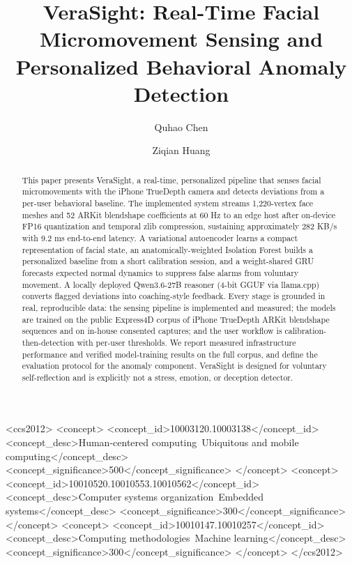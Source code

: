 \documentclass[sigconf]{acmart}
\begin{document}
\title[VeraSight: Real-Time Facial Micromovement Sensing]{VeraSight: Real-Time Facial Micromovement Sensing and Personalized Behavioral Anomaly Detection}

\author{Quhao Chen}

\author{Ziqian Huang}

\renewcommand{\shortauthors}{William Quhao Chen and Ziqian Huang}

\begin{abstract}
This paper presents VeraSight, a real-time, personalized pipeline that senses
facial micromovements with the iPhone TrueDepth camera and detects deviations
from a per-user behavioral baseline. The implemented system streams 1,220-vertex
face meshes and 52 ARKit blendshape coefficients at 60 Hz to an edge host after
on-device FP16 quantization and temporal zlib compression, sustaining
approximately 282 KB/s with 9.2 ms end-to-end latency. A variational
autoencoder learns a compact representation of facial state, an
anatomically-weighted Isolation Forest builds a personalized baseline from a
short calibration session, and a weight-shared GRU forecasts expected normal
dynamics to suppress false alarms from voluntary movement. A locally deployed
Qwen3.6-27B reasoner (4-bit GGUF via llama.cpp) converts flagged deviations into
coaching-style feedback. Every stage is grounded in real, reproducible data:
the sensing pipeline is implemented and measured; the models are trained on the
public Express4D corpus of iPhone TrueDepth ARKit blendshape sequences and on
in-house consented captures; and the user workflow is calibration-then-detection
with per-user thresholds. We report measured infrastructure performance and verified
model-training results on the full corpus, and define the evaluation protocol
for the anomaly component. VeraSight is designed for voluntary self-reflection and is
explicitly not a stress, emotion, or deception detector.
\end{abstract}

\begin{CCSXML}
<ccs2012>
  <concept>
    <concept_id>10003120.10003138</concept_id>
    <concept_desc>Human-centered computing~Ubiquitous and mobile computing</concept_desc>
    <concept_significance>500</concept_significance>
  </concept>
  <concept>
    <concept_id>10010520.10010553.10010562</concept_id>
    <concept_desc>Computer systems organization~Embedded systems</concept_desc>
    <concept_significance>300</concept_significance>
  </concept>
  <concept>
    <concept_id>10010147.10010257</concept_id>
    <concept_desc>Computing methodologies~Machine learning</concept_desc>
    <concept_significance>300</concept_significance>
  </concept>
</ccs2012>
\end{CCSXML}
\end{document}
